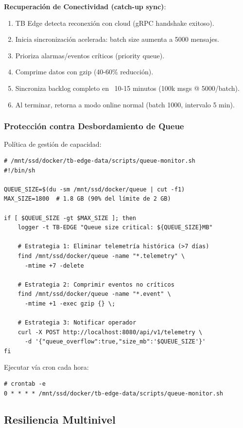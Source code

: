 \textbf{Recuperación de Conectividad (catch-up sync)}:
\begin{enumerate}
    \item TB Edge detecta reconexión con cloud (gRPC handshake exitoso).
    \item Inicia sincronización acelerada: batch size aumenta a 5000 mensajes.
    \item Prioriza alarmas/eventos críticos (priority queue).
    \item Comprime datos con gzip (40-60\% reducción).
    \item Sincroniza backlog completo en ~10-15 minutos (100k msgs @ 5000/batch).
    \item Al terminar, retorna a modo online normal (batch 1000, intervalo 5 min).
\end{enumerate}

\subsubsection{Protección contra Desbordamiento de Queue}

Política de gestión de capacidad:
\begin{verbatim}
# /mnt/ssd/docker/tb-edge-data/scripts/queue-monitor.sh
#!/bin/sh

QUEUE_SIZE=$(du -sm /mnt/ssd/docker/queue | cut -f1)
MAX_SIZE=1800  # 1.8 GB (90% del límite de 2 GB)

if [ $QUEUE_SIZE -gt $MAX_SIZE ]; then
    logger -t TB-EDGE "Queue size critical: ${QUEUE_SIZE}MB"
    
    # Estrategia 1: Eliminar telemetría histórica (>7 días)
    find /mnt/ssd/docker/queue -name "*.telemetry" \
      -mtime +7 -delete
    
    # Estrategia 2: Comprimir eventos no críticos
    find /mnt/ssd/docker/queue -name "*.event" \
      -mtime +1 -exec gzip {} \;
    
    # Estrategia 3: Notificar operador
    curl -X POST http://localhost:8080/api/v1/telemetry \
      -d '{"queue_overflow":true,"size_mb":'$QUEUE_SIZE'}'
fi
\end{verbatim}

Ejecutar vía cron cada hora:
\begin{verbatim}
# crontab -e
0 * * * * /mnt/ssd/docker/tb-edge-data/scripts/queue-monitor.sh
\end{verbatim}

\subsection{Resiliencia Multinivel}

